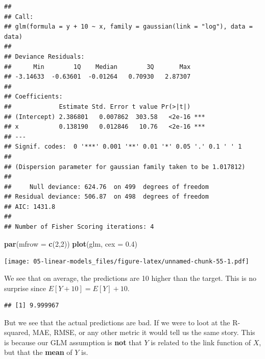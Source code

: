 \documentclass[
  openany]{book}
\newenvironment{Shaded}{\begin{snugshade}}{\end{snugshade}}
\newcommand{\DataTypeTok}[1]{\textcolor[rgb]{0.13,0.29,0.53}{#1}}
\newcommand{\DecValTok}[1]{\textcolor[rgb]{0.00,0.00,0.81}{#1}}
\newcommand{\FloatTok}[1]{\textcolor[rgb]{0.00,0.00,0.81}{#1}}
\newcommand{\KeywordTok}[1]{\textcolor[rgb]{0.13,0.29,0.53}{\textbf{#1}}}
\newcommand{\NormalTok}[1]{#1}
\newcommand{\OperatorTok}[1]{\textcolor[rgb]{0.81,0.36,0.00}{\textbf{#1}}}
\newcommand{\StringTok}[1]{\textcolor[rgb]{0.31,0.60,0.02}{#1}}
\begin{document}
\begin{verbatim}
## 
## Call:
## glm(formula = y + 10 ~ x, family = gaussian(link = "log"), data = data)
## 
## Deviance Residuals: 
##      Min        1Q    Median        3Q       Max  
## -3.14633  -0.63601  -0.01264   0.70930   2.87307  
## 
## Coefficients:
##             Estimate Std. Error t value Pr(>|t|)    
## (Intercept) 2.386801   0.007862  303.58   <2e-16 ***
## x           0.138190   0.012846   10.76   <2e-16 ***
## ---
## Signif. codes:  0 '***' 0.001 '**' 0.01 '*' 0.05 '.' 0.1 ' ' 1
## 
## (Dispersion parameter for gaussian family taken to be 1.017812)
## 
##     Null deviance: 624.76  on 499  degrees of freedom
## Residual deviance: 506.87  on 498  degrees of freedom
## AIC: 1431.8
## 
## Number of Fisher Scoring iterations: 4
\end{verbatim}

\begin{Shaded}
\begin{Highlighting}[]
\KeywordTok{par}\NormalTok{(}\DataTypeTok{mfrow =} \KeywordTok{c}\NormalTok{(}\DecValTok{2}\NormalTok{,}\DecValTok{2}\NormalTok{))}
\KeywordTok{plot}\NormalTok{(glm, }\DataTypeTok{cex =} \FloatTok{0.4}\NormalTok{)}
\end{Highlighting}
\end{Shaded}

\texttt{[image: 05-linear-models\_files/figure-latex/unnamed-chunk-55-1.pdf]}

We see that on average, the predictions are 10 higher than the target. This is no surprise since \(E[Y + 10] = E[Y] + 10\).

\begin{Shaded}
\end{Shaded}

\begin{verbatim}
## [1] 9.999967
\end{verbatim}

But we see that the actual predictions are bad. If we were to loot at the R-squared, MAE, RMSE, or any other metric it would tell us the same story. This is because our GLM assumption is \textbf{not} that \(Y\) is related to the link function of \(X\), but that the \textbf{mean} of \(Y\) is.
\end{document}
